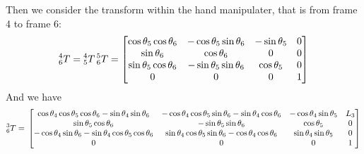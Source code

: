 \documentclass{article}
\begin{document}
Then we consider the transform within the hand manipulater, that is from frame 4 to frame 6:
\[
    \prescript{4}{6}{T} = \prescript{4}{5}{T} \prescript{5}{6}{T} =
    \begin{bmatrix}\cos{ {{\theta }_5} } \cos{ {{\theta }_6} } & - \cos{ {{\theta }_5} } \sin{ {{\theta }_6} }  & -\sin{ {{\theta }_5} } & 0\\
        \sin{ {{\theta }_6} } & \cos{ {{\theta }_6} } & 0 & 0\\
        \sin{ {{\theta }_5} } \cos{ {{\theta }_6} } & - \sin{ {{\theta }_5} } \sin{ {{\theta }_6} }  & \cos{ {{\theta }_5} } & 0\\
        0 & 0 & 0 & 1
    \end{bmatrix}
\]
And we have
\[
        \prescript{3}{6}{T} = \\
    \begin{bmatrix}\cos{{{\theta }_4} } \cos{ {{\theta }_5} } \cos{ {{\theta }_6} }-\sin{ {{\theta }_4} } \sin{ {{\theta }_6} } & - \cos{ {{\theta }_4} } \cos{ {{\theta }_5} } \sin{ {{\theta }_6} } -\sin{ {{\theta }_4} } \cos{ {{\theta }_6} } & - \cos{ {{\theta }_4} } \sin{ {{\theta }_5} }  & {L_3}\\
        \sin{ {{\theta }_5} } \cos{ {{\theta }_6} } & - \sin{ {{\theta }_5} } \sin{ {{\theta }_6} }  & \cos{ {{\theta }_5} } & 0\\
        - \cos{{{\theta }_4}} \sin{ {{\theta }_6} } -\sin{ {{\theta }_4} } \cos{ {{\theta }_5} } \cos{ {{\theta }_6} } & \sin{ {{\theta }_4} } \cos{ {{\theta }_5} } \sin{ {{\theta }_6} }-\cos{ {{\theta }_4} } \cos{ {{\theta }_6} } & \sin{ {{\theta }_4} } \sin{ {{\theta }_5} } & 0\\
        0 & 0 & 0 & 1
    \end{bmatrix}
\]
\end{document}
